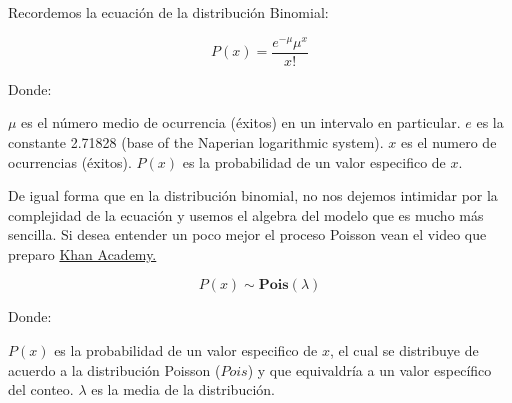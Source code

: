 \documentclass[
]{book}
\newenvironment{Shaded}{\begin{snugshade}}{\end{snugshade}}
\newcommand{\DataTypeTok}[1]{\textcolor[rgb]{0.13,0.29,0.53}{#1}}
\newcommand{\DecValTok}[1]{\textcolor[rgb]{0.00,0.00,0.81}{#1}}
\newcommand{\KeywordTok}[1]{\textcolor[rgb]{0.13,0.29,0.53}{\textbf{#1}}}
\newcommand{\NormalTok}[1]{#1}
\newcommand{\OperatorTok}[1]{\textcolor[rgb]{0.81,0.36,0.00}{\textbf{#1}}}
\newcommand{\StringTok}[1]{\textcolor[rgb]{0.31,0.60,0.02}{#1}}
\begin{document}
Recordemos la ecuación de la distribución Binomial:

\begin{equation} 
  P\left( x \right) = \frac{{e^{ - \mu } \mu ^x }}{{x!}}
  \label{eq:binom}
\end{equation}

Donde:

\(\mu\) es el número medio de ocurrencia (éxitos) en un intervalo en particular.
\(e\) es la constante 2.71828 (base of the Naperian logarithmic system).
\(x\) es el numero de ocurrencias (éxitos).
\(P(x)\) es la probabilidad de un valor especifico de \(x\).

De igual forma que en la distribución binomial, no nos dejemos intimidar por la complejidad de la ecuación y usemos el algebra del modelo que es mucho más sencilla. Si desea entender un poco mejor el proceso Poisson vean el video que preparo \href{https://www.youtube.com/watch?v=Vhjiw8r8kR4}{Khan Academy.}

\begin{equation} 
  P\left( x \right) \sim \mathbf{Pois}(\lambda)
  \label{eq:binom}
\end{equation}

Donde:

\(P(x)\) es la probabilidad de un valor especifico de \(x\), el cual se distribuye de acuerdo a la distribución Poisson (\(Pois\)) y que equivaldría a un valor específico del conteo.
\(\lambda\) es la media de la distribución.

\begin{Shaded}
\end{Shaded}
\end{document}
